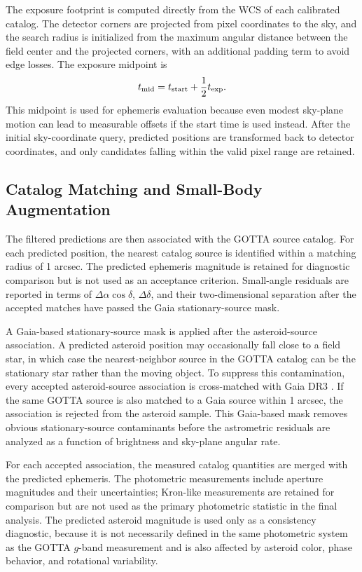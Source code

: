 \documentclass[referee]{raa}
\begin{document}
The exposure footprint is computed directly from the WCS of each calibrated catalog. The detector corners are projected from pixel coordinates to the sky, and the search radius is initialized from the maximum angular distance between the field center and the projected corners, with an additional padding term to avoid edge losses. The exposure midpoint is
\begin{equation}
t_{\rm mid}=t_{\rm start}+\frac{1}{2}t_{\rm exp}.
\end{equation}
This midpoint is used for ephemeris evaluation because even modest sky-plane motion can lead to measurable offsets if the start time is used instead. After the initial sky-coordinate query, predicted positions are transformed back to detector coordinates, and only candidates falling within the valid pixel range are retained.

\subsection{Catalog Matching and Small-Body Augmentation}

The filtered predictions are then associated with the GOTTA source catalog. For each predicted position, the nearest catalog source is identified within a matching radius of 1 arcsec. The predicted ephemeris magnitude is retained for diagnostic comparison but is not used as an acceptance criterion. Small-angle residuals are reported in terms of \(\Delta\alpha\cos\delta\), \(\Delta\delta\), and their two-dimensional separation after the accepted matches have passed the Gaia stationary-source mask.

A Gaia-based stationary-source mask is applied after the asteroid-source association. A predicted asteroid position may occasionally fall close to a field star, in which case the nearest-neighbor source in the GOTTA catalog can be the stationary star rather than the moving object. To suppress this contamination, every accepted asteroid-source association is cross-matched with Gaia DR3 \citep{Gaia2023}. If the same GOTTA source is also matched to a Gaia source within 1 arcsec, the association is rejected from the asteroid sample. This Gaia-based mask removes obvious stationary-source contaminants before the astrometric residuals are analyzed as a function of brightness and sky-plane angular rate.

For each accepted association, the measured catalog quantities are merged with the predicted ephemeris. The photometric measurements include aperture magnitudes and their uncertainties; Kron-like measurements are retained for comparison but are not used as the primary photometric statistic in the final analysis. The predicted asteroid magnitude is used only as a consistency diagnostic, because it is not necessarily defined in the same photometric system as the GOTTA $g$-band measurement and is also affected by asteroid color, phase behavior, and rotational variability.
\end{document}
